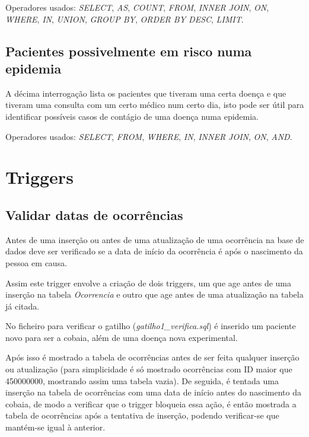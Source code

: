 \documentclass[article, a4paper, 12pt, oneside]{memoir}
\begin{document}
Operadores usados: \emph{SELECT}, \emph{AS}, \emph{COUNT}, \emph{FROM}, \emph{INNER JOIN}, \emph{ON}, \emph{WHERE}, \emph{IN}, \emph{UNION}, \emph{GROUP BY}, \emph{ORDER BY DESC}, \emph{LIMIT}.

\section{Pacientes possivelmente em risco numa epidemia}
A décima interrogação lista os pacientes que tiveram uma certa doença e que tiveram uma consulta com um certo médico num certo dia, isto pode ser útil para identificar possíveis casos de contágio de uma doença numa epidemia.

Operadores usados: \emph{SELECT}, \emph{FROM}, \emph{WHERE}, \emph{IN}, \emph{INNER JOIN}, \emph{ON}, \emph{AND}.

\newpage
\chapter[Triggers][Triggers]{Triggers} \label{\thechapter}

\section{Validar datas de ocorrências}
Antes de uma inserção ou antes de uma atualização de uma ocorrência na base de dados deve ser verificado se a data de início da ocorrência é após o nascimento da pessoa em causa.

Assim este trigger envolve a criação de dois triggers, um que age antes de uma inserção na tabela \emph{Ocorrencia} e outro que age antes de uma atualização na tabela já citada.

No ficheiro para verificar o gatilho (\textit{gatilho1\_verifica.sql}) é inserido um paciente novo para ser a cobaia, além de uma doença nova experimental.

Após isso é mostrado a tabela de ocorrências antes de ser feita qualquer inserção ou atualização (para simplicidade é só mostrado ocorrências com ID maior que 450000000, mostrando assim uma tabela vazia). De seguida, é tentada uma inserção na tabela de ocorrências com uma data de início antes do nascimento da cobaia, de modo a verificar que o trigger bloqueia essa ação, é então mostrada a tabela de ocorrências após a tentativa de inserção, podendo verificar-se que mantém-se igual à anterior.
\end{document}

